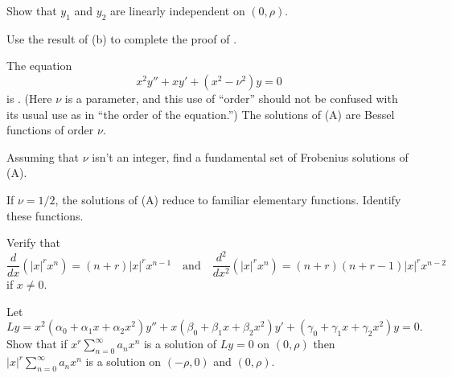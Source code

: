 \begin{exerciselist}
\begin{alist}
\item %
Show that $y_1$ and $y_2$
are linearly independent on $(0,\rho)$. 
\item %
 Use the  result of (b) to
complete the proof of .
\end{alist}

\item\label{exer:7.5.53}The equation
\[\tag{A}
 x^2y''+xy'+(x^2-\nu^2)y=0
\]
is
.
(Here $\nu$ is a parameter, and this use of ``order'' should not be
confused with its usual use as in ``the order of the equation.'') The
solutions of (A) are Bessel functions of order $\nu$.
\begin{alist}
\item %
Assuming that $\nu$ isn't
an integer, find a fundamental set of Frobenius solutions of
(A).
\item %
 If $\nu=1/2$, the solutions of
(A) reduce to familiar elementary functions. Identify these
functions.
\end{alist}

\item\label{exer:7.5.54}\begin{alist}
\item %
Verify that
\[
\frac{d}{dx}\left(|x|^rx^n\right)=(n+r)|x|^rx^{n-1}\quad\text{and}\quad 
\frac{d^2}{dx^2}\left(|x|^rx^n\right)=(n+r)(n+r-1)|x|^rx^{n-2}
\]
if $x\ne0$.
\item %
Let
\[
Ly=
x^2(\alpha_0+\alpha_1x+\alpha_2x^2)y''+x(\beta_0+\beta_1x+\beta_2x^2)y'
+(\gamma_0+\gamma_1x+\gamma_2x^2)y=0.
\]
 Show   that if $x^r\sum_{n=0}^\infty a_nx^n$ is a solution of
$Ly=0$ on
$(0,\rho)$ then  $|x|^r\sum_{n=0}^\infty a_nx^n$ is a solution on
$(-\rho,0)$ and $(0,\rho)$.
\end{alist}


\end{exerciselist}
